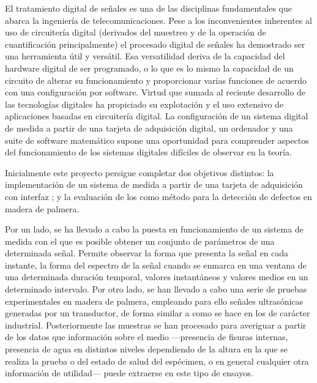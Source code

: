 \prosec{}


El tratamiento digital de señales es una de las disciplinas fundamentales
que abarca la ingeniería de telecomunicaciones. Pese a los inconvenientes
inherentes al uso de circuitería digital (derivados del muestreo y de la
operación de cuantificación principalmente) el procesado digital de señales
ha demostrado ser una herramienta útil y versátil. Esa versatilidad deriva
de la capacidad del hardware digital de ser programado, o lo que es lo
mismo la capacidad de un circuito de alterar su funcionamiento y
proporcionar varias funciones de acuerdo con una configuración por
software. Virtud que sumada al reciente desarrollo de las tecnologías
digitales ha propiciado su explotación y el uso extensivo de aplicaciones
basadas en circuitería digital. La configuración de un sistema digital de
medida a partir de una tarjeta de adquisición digital, un ordenador y una
suite de software matemático supone una oportunidad para comprender
aspectos del funcionamiento de los sistemas digitales difíciles de observar
en la teoría.


\prosec{}


Inicialmente este proyecto persigue completar dos objetivos distintos: la
implementación de un sistema de medida a partir de una tarjeta de
adquisición con interfaz ; y la evaluación de los  como
método para la detección de defectos en madera de palmera.

Por un lado, se ha llevado a cabo la puesta en funcionamiento de un sistema
de medida con el que es posible obtener un conjunto de parámetros de una
determinada señal. Permite observar la forma que presenta la señal en cada
instante, la forma del espectro de la señal cuando se enmarca en una
ventana de una determinada duración temporal, valores instantáneos y
valores medios en un determinado intervalo. Por otro lado, se han llevado a
cabo una serie de pruebas experimentales en madera de palmera, empleando
para ello señales ultrasónicas generadas por un transductor, de forma
similar a como se hace en los  de carácter industrial.
Posteriormente las muestras se han procesado para averiguar a partir de los
datos que información sobre el medio ---presencia de fisuras internas,
presencia de agua en distintos niveles dependiendo de la altura en la que
se realiza la prueba o del estado de salud del espécimen, o en general
cualquier otra información de utilidad--- puede extraerse en este tipo de
ensayos.

